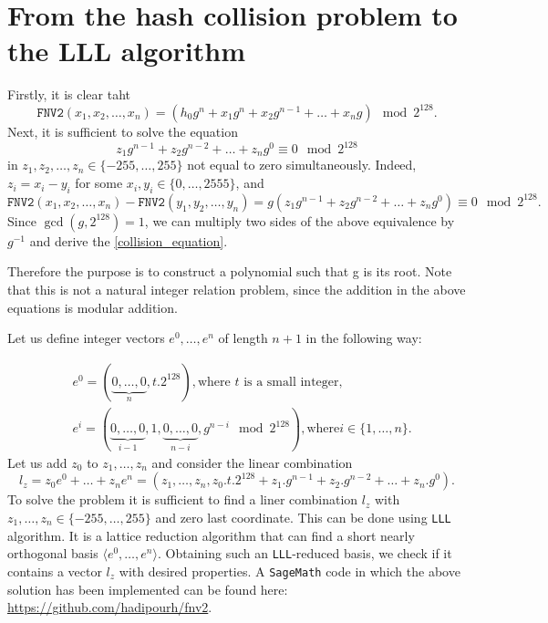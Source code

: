 \documentclass{iacrtrans}
\begin{document}
\section{From the hash collision problem to the LLL algorithm}
Firstly, it is clear taht
\begin{equation*}
\texttt{FNV2}(x_{1}, x_{2}, \ldots, x_{n}) = (h_{0}g^{n} + x_{1}g^{n} + x_{2}g^{n-1} + \ldots + x_{n}g) \mod 2^{128}.
\end{equation*}
Next, it is sufficient to solve the equation
\begin{equation}
\label{collision_equation}
z_{1}g^{n - 1} + z_{2}g^{n - 2} + \ldots + z_{n}g^{0} \equiv 0 \mod 2^{128}
\end{equation}
in $z_{1}, z_{2}, \ldots, z_{n}\in \{-255,\ldots, 255\}$ not equal to zero  simultaneously. Indeed, $z_{i} = x_{i} - y_{i}$ for some $x_{i}, y_{i}\in \{0, \ldots, 2555\}$, and 
\begin{equation*}
\texttt{FNV2}(x_{1}, x_{2}, \ldots, x_{n}) - \texttt{FNV2}(y_{1}, y_{2}, \ldots, y_{n}) = g(z_{1}g^{n-1} + z_{2}g^{n-2} + \ldots + z_{n}g^{0}) \equiv 0 \mod 2^{128}. 
\end{equation*}
Since $\gcd(g, 2^{128}) = 1$, we can multiply two sides of the above equivalence by $g^{-1}$ and derive the \ref{collision_equation}. 

Therefore the purpose is to construct a polynomial such that g is its root. Note that this is not a natural integer relation problem, since the addition in the above equations is modular addition. 

Let us define integer vectors $e^{0}, \ldots, e^{n}$ of length $n + 1$ in the following way:

\begin{align*}
&
e^{0} = (\underbrace{0, \ldots, 0}_{n}, t.2^{128}), \text{where $t$ is a small integer},\\
&e^{i} = (\underbrace{0, \ldots, 0}_{i-1}, 1, \underbrace{0, \ldots, 0}_{n-i}, g^{n - i} \mod 2^{128}), \text{where} i \in \{1, \ldots, n\}.
\end{align*}
Let us add $z_{0}$ to $z_{1}, \ldots, z_{n}$ and consider the linear combination
\begin{equation*}
l_{z} = z_{0}e^{0} + \ldots + z_{n}e^{n} = (z_{1}, \ldots, z_{n}, z_{0}.t.2^{128} + z_{1}.g^{n-1} + z_{2}.g^{n-2} + \ldots + z_{n}.g^{0}).
\end{equation*}
To solve the problem it is sufficient to find a liner combination $l_{z}$ with $z_{1}, \ldots, z_{n}\in \{-255, \ldots, 255\}$ and zero last coordinate. This can be done using \texttt{LLL} algorithm. It is a lattice reduction algorithm that can find a short nearly orthogonal basis $\langle e^{0}, \ldots, e^{n} \rangle$. Obtaining such an \texttt{LLL}-reduced basis, we check if it contains a vector $l_{z}$ with desired properties\cite{gorodilova2018problems}. A \texttt{SageMath} \cite{sagemath} code in which the above solution has been implemented can be found here: \url{https://github.com/hadipourh/fnv2}.

{}

\end{document}
